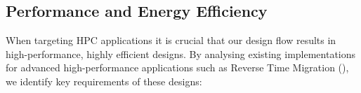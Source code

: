 \begin{comment}
\begin{comment}
\section{Overview}

Figure \ref{fig:design-flow-overview} provides a brief overview of the
proposed design flow. First a high level application is produced as
the input to our flow. This is then partitioned into a software part
and a hardware part to run on the dataflow accelerator. A dataflow
kernel is generated from the original description. Aspect descriptions
are used to control the optimisation process.

Thus the inputs to the design flow are:
\begin{itemize}
\item High-level source specification
\item Aspect descriptions for controlling the compilation process
\end{itemize}

\begin{figure}[!h]
  \texttt{[image: figs/asap13-design-flow.pdf\_tex]}
  \caption{Proposed approach for aspect-driven compilation of dataflow
    designs.}
  \label{fig:design-flow-overview}
\end{figure}
The design flow produces as its output a number of implementations based on
requirements specified through aspects.

The following algorithm describes the operation of the proposed design flow:

\begin{lstlisting}
  for (in as do als)
\end{lstlisting}

\end{comment}


\subsection{Performance and Energy Efficiency}
When targeting HPC applications it is crucial that our design flow
results in high-performance, highly efficient designs. By analysing
existing implementations for advanced high-performance applications
such as Reverse Time Migration (), we identify key
requirements of these designs:

